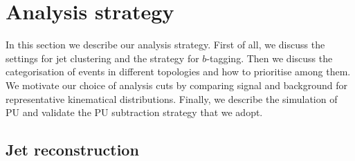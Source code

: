 
\section{Analysis strategy}
\label{sec:analysis}

In this section we describe our analysis strategy.
%
First of all, we discuss the settings
for jet clustering  and the strategy for $b$-tagging.
%
Then we discuss the categorisation of events in different
topologies and how to prioritise among them.
%
We motivate our choice of analysis cuts by comparing signal and background
for representative kinematical distributions.
%
Finally, we describe the simulation of PU and validate
the PU subtraction strategy that we adopt.

\subsection{Jet reconstruction}

